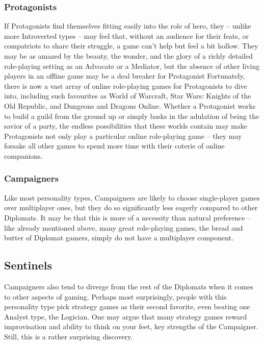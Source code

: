\documentclass{article}
\begin{document}
\subsubsection{Protagonists}
If Protagonists find themselves fitting easily into the role of hero, they – unlike more Introverted types – may feel that, without an audience for their feats, or compatriots to share their struggle, a game can’t help but feel a bit hollow. They may be as amazed by the beauty, the wonder, and the glory of a richly detailed role-playing setting as an Advocate or a Mediator, but the absence of other living players in an offline game may be a deal breaker for Protagonist Fortunately, there is now a vast array of online role-playing games for Protagonists to dive into, including such favourites as World of Warcraft, Star Wars: Knights of the Old Republic, and Dungeons and Dragons Online. Whether a Protagonist works to build a guild from the ground up or simply basks in the adulation of being the savior of a party, the endless possibilities that these worlds contain may make Protagonists not only play a particular online role-playing game – they may forsake all other games to spend more time with their coterie of online companions.
\subsubsection{Campaigners}
Like most personality types, Campaigners are likely to choose single-player games over multiplayer ones, but they do so significantly less eagerly compared to other Diplomats. It may be that this is more of a necessity than natural preference – like already mentioned above, many great role-playing games, the bread and butter of Diplomat gamers, simply do not have a multiplayer component.
\subsection{Sentinels}
Campaigners also tend to diverge from the rest of the Diplomats when it comes to other aspects of gaming. Perhaps most surprisingly, people with this personality type pick strategy games as their second favorite, even beating one Analyst type, the Logician. One may argue that many strategy games reward improvisation and ability to think on your feet, key strengths of the Campaigner. Still, this is a rather surprising discovery.
\end{document}
